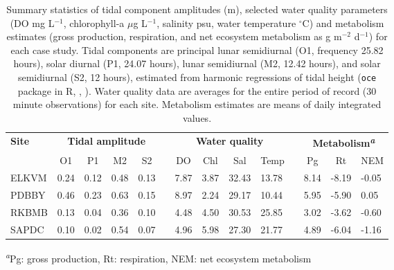 \documentclass[letterpaper,12pt,oneside]{article}\usepackage[]{graphicx}\usepackage[]{color}
\begin{document}
%
\begin{table}[!tbp]
\caption{Summary statistics of tidal component amplitudes (m), selected water quality parameters (\ac{DO} mg L$^{-1}$, chlorophyll-a $\mu$g L$^{-1}$, salinity psu, water temperature $^{\circ}$C)  and metabolism estimates (gross production, respiration, and net ecosystem metabolism as g m$^{-2}$ d$^{-1}$) for each case study.  Tidal components are principal lunar semidiurnal (O1, frequency 25.82 hours), solar diurnal (P1, 24.07 hours), lunar semidiurnal (M2, 12.42 hours), and solar semidiurnal (S2, 12 hours), estimated from harmonic regressions of tidal height (\texttt{oce} package in R, \citealt{Foreman89}, ).  Water quality data are averages for the entire period of record (30 minute observations) for each site.  Metabolism estimates are means of daily integrated values.\label{tab:case_att}} 
\begin{center}
\begin{tabular}{lllllcllllclll}
\hline\hline
\multicolumn{1}{l}{\bfseries Site}&\multicolumn{4}{c}{\bfseries Tidal amplitude}&\multicolumn{1}{c}{\bfseries }&\multicolumn{4}{c}{\bfseries Water quality}&\multicolumn{1}{c}{\bfseries }&\multicolumn{3}{c}{\bfseries Metabolism\textsuperscript{\textit{a}}}\tabularnewline
\cline{2-5} \cline{7-10} \cline{12-14}
\multicolumn{1}{l}{}&\multicolumn{1}{c}{O1}&\multicolumn{1}{c}{P1}&\multicolumn{1}{c}{M2}&\multicolumn{1}{c}{S2}&\multicolumn{1}{c}{}&\multicolumn{1}{c}{DO}&\multicolumn{1}{c}{Chl}&\multicolumn{1}{c}{Sal}&\multicolumn{1}{c}{Temp}&\multicolumn{1}{c}{}&\multicolumn{1}{c}{Pg}&\multicolumn{1}{c}{Rt}&\multicolumn{1}{c}{NEM}\tabularnewline
\hline
ELKVM&0.24&0.12&0.48&0.13&&7.87&3.87&32.43&13.78&&8.14&-8.19&-0.05\tabularnewline
PDBBY&0.46&0.23&0.63&0.15&&8.97&2.24&29.17&10.44&&5.95&-5.90& 0.05\tabularnewline
RKBMB&0.13&0.04&0.36&0.10&&4.48&4.50&30.53&25.85&&3.02&-3.62&-0.60\tabularnewline
SAPDC&0.10&0.02&0.54&0.07&&4.96&5.98&27.30&21.77&&4.89&-6.04&-1.16\tabularnewline
\hline
\end{tabular}
\end{center}
\footnotesize\textsuperscript{\textit{a}}Pg: gross production, Rt: respiration, NEM: net ecosystem metabolism\end{table}
\end{document}
